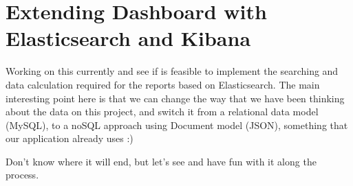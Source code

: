 \chapter{Extending Dashboard with Elasticsearch and Kibana}
Working on this currently and see if is feasible to implement the searching and
data calculation required for the reports based on Elasticsearch. The
main interesting point here is that we can change the way that we have been
thinking about the data on this project, and switch it from a relational data
model (MySQL), to a noSQL approach using Document model (JSON), something that our
application already uses :)

Don't know where it will end, but let's see and have fun with it along the
process.

